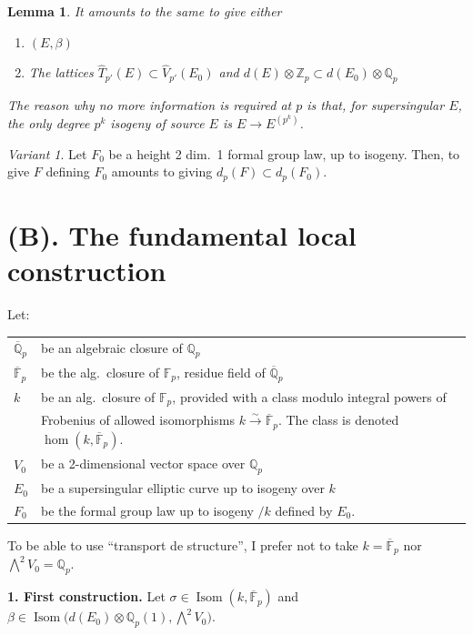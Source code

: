 \documentclass[11pt,a4paper]{article}
\theoremstyle{plain}
\newtheorem{lemma}[theorem]{Lemma}
\theoremstyle{definition}
\theoremstyle{remark}
\newtheorem*{variant}{Variant}
\DeclareMathOperator{\Isom}{Isom}
\newcommand{\F}{\mathbb{F}}
\newcommand{\Qpbar}{\overline{\mathbb{Q}}_{p}}
\newcommand{\Fpbar}{\overline{\mathbb{F}}_{p}}
\newcommand{\Zp}{\mathbb{Z}_{p}}
\newcommand{\Qp}{\mathbb{Q}_{p}}
\begin{document}
\begin{lemma}
It amounts to the same to give either
\begin{enumerate}[label=(\alph*)]
\item $(E, \beta)$
\item The lattices $\widehat{T}_{p'}(E) \subset \widehat{V}_{p'}(E_{0})$ and $d(E) \otimes \Zp \subset d(E_{0}) \otimes \Qp$
\end{enumerate}
The reason why no more information is required at $p$ is that, for supersingular $E$, the only degree $p^{k}$ isogeny of source $E$ is $E \to E^{(p^{k})}$.
\end{lemma}

\begin{variant}
Let $F_{0}$ be a height 2 dim.\ 1 formal group law, up to isogeny. Then, to give $F$ defining $F_{0}$ amounts to giving $d_{p}(F) \subset d_{p}(F_{0})$.
\end{variant}


\section*{(B). The fundamental local construction}

\noindent
Let:
\begin{center}
\begin{tabular}{@{}ll@{}}
$\Qpbar$ & be an algebraic closure of $\Qp$ \\
$\Fpbar$ & be the alg.\ closure of $\F_{p}$, residue field of $\Qpbar$ \\
$k$ & be an alg.\ closure of $\F_{p}$, provided with a class modulo integral powers of \\
& Frobenius of allowed isomorphisms $k \xrightarrow{\sim} \Fpbar$. The class is denoted $\hom(k, \Fpbar)$. \\
$V_{0}$ & be a 2-dimensional vector space over $\Qp$ \\
$E_{0}$ & be a supersingular elliptic curve up to isogeny over $k$ \\
$F_{0}$ & be the formal group law up to isogeny $/k$ defined by $E_{0}$.
\end{tabular}
\end{center}

To be able to use ``transport de structure'', I prefer not to take $k = \Fpbar$ nor $\bigwedge^{2} V_{0} = \Qp$.

\medskip

\noindent
\textbf{1. First construction.} Let $\sigma \in \Isom(k, \Fpbar)$ and $\beta \in \Isom\bigl(d(E_{0}) \otimes \Qp(1), \bigwedge^{2} V_{0}\bigr)$.
\end{document}
